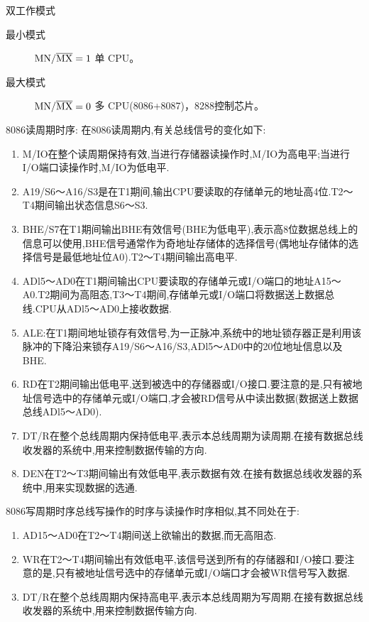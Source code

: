 双工作模式
\begin{description}
	\item[最小模式] $\rm MN/\overline{MX}=1$ 单 CPU。
	\item[最大模式] $\rm MN/\overline{MX}=0$ 多 CPU(8086+8087)，8288控制芯片。 
\end{description}

8086读周期时序:
在8086读周期内,有关总线信号的变化如下:
\begin{enumerate}
\item M/IO在整个读周期保持有效,当进行存储器读操作时,M/IO为高电平;当进行I/O端口读操作时,M/IO为低电平.
\item A19/S6～A16/S3是在T1期间,输出CPU要读取的存储单元的地址高4位.T2～T4期间输出状态信息S6～S3.
\item BHE/S7在T1期间输出BHE有效信号(BHE为低电平),表示高8位数据总线上的信息可以使用,BHE信号通常作为奇地址存储体的选择信号(偶地址存储体的选择信号是最低地址位A0).T2～T4期间输出高电平.
\item ADl5～AD0在T1期间输出CPU要读取的存储单元或I/O端口的地址A15～A0.T2期间为高阻态,T3～T4期间,存储单元或I/O端口将数据送上数据总线.CPU从ADl5～AD0上接收数据.
\item ALE:在T1期间地址锁存有效信号,为一正脉冲,系统中的地址锁存器正是利用该脉冲的下降沿来锁存A19/S6～A16/S3,ADl5～AD0中的20位地址信息以及BHE.
\item RD在T2期间输出低电平,送到被选中的存储器或I/O接口.要注意的是,只有被地址信号选中的存储单元或I/O端口,才会被RD信号从中读出数据(数据送上数据总线ADl5～AD0).
\item DT/R在整个总线周期内保持低电平,表示本总线周期为读周期.在接有数据总线收发器的系统中,用来控制数据传输的方向.
\item DEN在T2～T3期间输出有效低电平,表示数据有效.在接有数据总线收发器的系统中,用来实现数据的选通.
\end{enumerate}

8086写周期时序总线写操作的时序与读操作时序相似,其不同处在于:
\begin{enumerate}
\item 	
AD15～AD0在T2～T4期间送上欲输出的数据,而无高阻态.
\item WR在T2～T4期间输出有效低电平,该信号送到所有的存储器和I/O接口.要注意的是,只有被地址信号选中的存储单元或I/O端口才会被WR信号写入数据.
\item DT/R在整个总线周期内保持高电平,表示本总线周期为写周期.在接有数据总线收发器的系统中,用来控制数据传输方向.
\end{enumerate}

